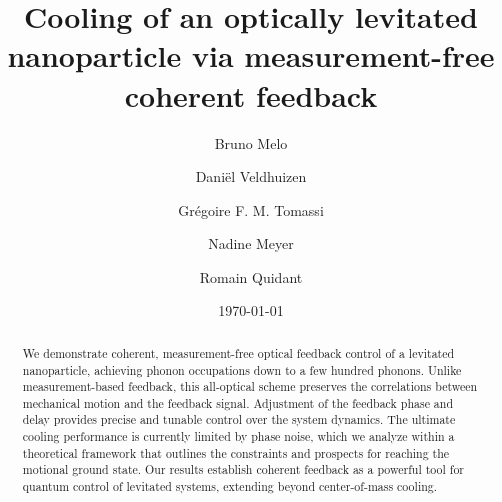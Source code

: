 \documentclass[reprint,aps,prl,superscriptaddress]{revtex4-2}
\begin{document}
\title{Cooling of an optically levitated nanoparticle via measurement-free coherent feedback}
\author{Bruno Melo}

\author{Dani{\"e}l Veldhuizen}

\author{Grégoire F. M. Tomassi}

\author{Nadine Meyer}

\author{Romain Quidant}

\date{\today}
\begin{abstract} 
We demonstrate coherent, measurement-free optical feedback control of a levitated nanoparticle, achieving phonon occupations down to a few hundred phonons. Unlike measurement-based feedback, this all-optical scheme preserves the correlations between mechanical motion and the feedback signal. Adjustment of the feedback phase and delay provides precise and tunable control over the system dynamics. The ultimate cooling performance is currently limited by phase noise, which we analyze within a theoretical framework that outlines the constraints and prospects for reaching the motional ground state. Our results establish coherent feedback as a powerful tool for quantum control of levitated systems, extending beyond center-of-mass cooling.%
\end{abstract}

\maketitle
\end{document}
